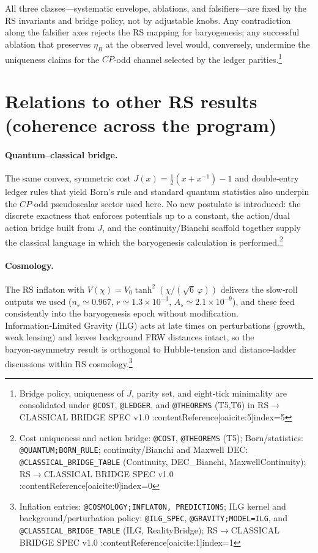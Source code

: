 \documentclass[11pt]{article}
\begin{document}
\medskip\noindent
All three classes—systematic envelope, ablations, and falsifiers—are fixed by the RS invariants and bridge policy, not by adjustable knobs. Any contradiction along the falsifier axes rejects the RS mapping for baryogenesis; any successful ablation that preserves \(\eta_B\) at the observed level would, conversely, undermine the uniqueness claims for the \(CP\)‑odd channel selected by the ledger parities.\footnote{Bridge policy, uniqueness of \(J\), parity set, and eight‑tick minimality are consolidated under \texttt{@COST}, \texttt{@LEDGER}, and \texttt{@THEOREMS} (T5,T6) in RS\(\to\)CLASSICAL BRIDGE SPEC v1.0 :contentReference[oaicite:5]{index=5}}

\section{Relations to other RS results (coherence across the program)}

\paragraph{Quantum–classical bridge.}
The same convex, symmetric cost \(J(x)=\tfrac12(x+x^{-1})-1\) and double‑entry ledger rules that yield Born’s rule and standard quantum statistics also underpin the \(CP\)‑odd pseudoscalar sector used here. No new postulate is introduced: the discrete exactness that enforces potentials up to a constant, the action/dual action bridge built from \(J\), and the continuity/Bianchi scaffold together supply the classical language in which the baryogenesis calculation is performed.\footnote{Cost uniqueness and action bridge: \texttt{@COST}, \texttt{@THEOREMS} (T5); Born/statistics: \texttt{@QUANTUM;BORN\_RULE}; continuity/Bianchi and Maxwell DEC: \texttt{@CLASSICAL\_BRIDGE\_TABLE} (Continuity, DEC\_Bianchi, MaxwellContinuity); RS\(\to\)CLASSICAL BRIDGE SPEC v1.0 :contentReference[oaicite:0]{index=0}}

\paragraph{Cosmology.}
The RS inflaton with \(V(\chi)=V_0\tanh^2(\chi/(\sqrt{6}\,\varphi))\) delivers the slow‑roll outputs we used (\(n_s\simeq 0.967\), \(r\simeq 1.3\times 10^{-3}\), \(A_s\simeq 2.1\times 10^{-9}\)), and these feed consistently into the baryogenesis epoch without modification. Information‑Limited Gravity (ILG) acts at late times on perturbations (growth, weak lensing) and leaves background FRW distances intact, so the baryon‑asymmetry result is orthogonal to Hubble‑tension and distance‑ladder discussions within RS cosmology.\footnote{Inflation entries: \texttt{@COSMOLOGY;INFLATON, PREDICTIONS}; ILG kernel and background/perturbation policy: \texttt{@ILG\_SPEC}, \texttt{@GRAVITY;MODEL=ILG}, and \texttt{@CLASSICAL\_BRIDGE\_TABLE} (ILG, RealityBridge); RS\(\to\)CLASSICAL BRIDGE SPEC v1.0 :contentReference[oaicite:1]{index=1}}
\end{document}
